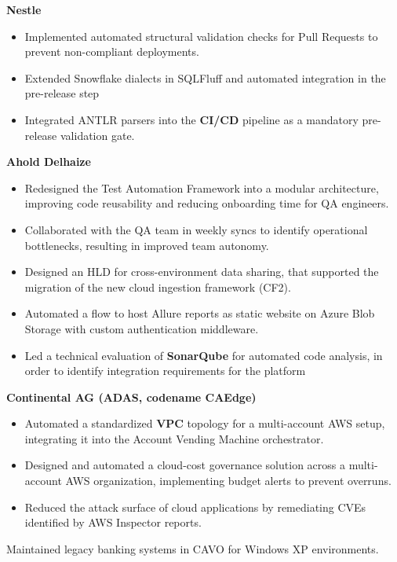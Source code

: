 \vspace{1em}
\noindent \textbf{Nestle}
\begin{itemize}[label=\tiny$\bullet$, leftmargin=1em, nosep]
	\item Implemented automated structural validation checks for Pull Requests to prevent non-compliant deployments.
	\item Extended Snowflake dialects in SQLFluff and automated integration in the pre-release step
	\item Integrated ANTLR parsers into the \textbf{CI/CD} pipeline as a mandatory pre-release validation gate.
\end{itemize}

\vspace{1em}
\noindent \textbf{Ahold Delhaize}
\begin{itemize}[label=\tiny$\bullet$, leftmargin=1em]
	\item Redesigned the Test Automation Framework into a modular architecture, improving code reusability and reducing onboarding time for QA engineers.
	\item Collaborated with the QA team in weekly syncs to identify operational bottlenecks, resulting in improved team autonomy.
	\item Designed an HLD for cross-environment data sharing, that supported the migration of the new cloud ingestion framework (CF2).
	\item Automated a flow to host Allure reports as static website on Azure Blob Storage with custom authentication middleware.
	\item Led a technical evaluation of \textbf{SonarQube} for automated code analysis, in order to identify integration requirements for the platform
\end{itemize}

\vspace{1em}
\noindent \textbf{Continental AG (ADAS, codename CAEdge)}
\begin{itemize}[label=\tiny$\bullet$, leftmargin=1em]
	\item Automated a standardized \textbf{VPC} topology for a multi-account AWS setup, integrating it into the Account Vending Machine orchestrator.
	\item Designed and automated a cloud-cost governance solution across a multi-account AWS organization, implementing budget alerts to prevent overruns.
	\item Reduced the attack surface of cloud applications by remediating CVEs identified by AWS Inspector reports.
\end{itemize}

\vspace{5.0ex}
\small
Maintained legacy banking systems in CAVO for Windows XP environments.
